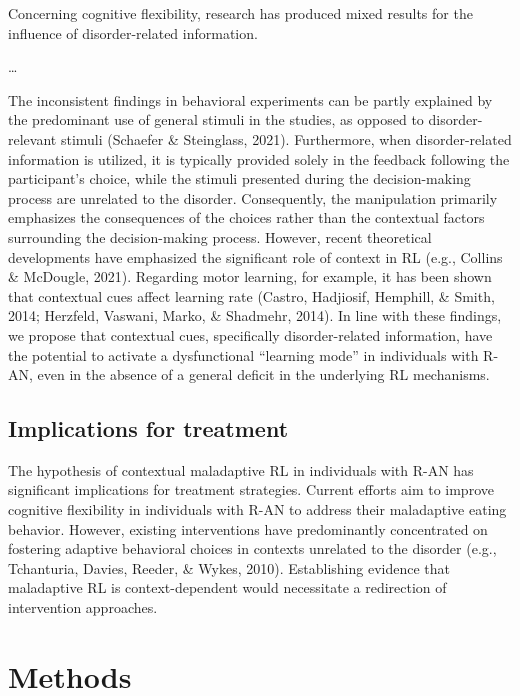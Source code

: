 \documentclass[
  man,floatsintext]{apa6}
\begin{document}
Concerning cognitive flexibility, research has produced mixed results for the influence of disorder-related information.

\ldots{}

The inconsistent findings in behavioral experiments can be partly explained by the predominant use of general stimuli in the studies, as opposed to disorder-relevant stimuli (Schaefer \& Steinglass, 2021). Furthermore, when disorder-related information is utilized, it is typically provided solely in the feedback following the participant's choice, while the stimuli presented during the decision-making process are unrelated to the disorder. Consequently, the manipulation primarily emphasizes the consequences of the choices rather than the contextual factors surrounding the decision-making process. However, recent theoretical developments have emphasized the significant role of context in RL (e.g., Collins \& McDougle, 2021). Regarding motor learning, for example, it has been shown that contextual cues affect learning rate (Castro, Hadjiosif, Hemphill, \& Smith, 2014; Herzfeld, Vaswani, Marko, \& Shadmehr, 2014). In line with these findings, we propose that contextual cues, specifically disorder-related information, have the potential to activate a dysfunctional ``learning mode'' in individuals with R-AN, even in the absence of a general deficit in the underlying RL mechanisms.

\hypertarget{implications-for-treatment}{%
\subsection{Implications for treatment}\label{implications-for-treatment}}

The hypothesis of contextual maladaptive RL in individuals with R-AN has significant implications for treatment strategies. Current efforts aim to improve cognitive flexibility in individuals with R-AN to address their maladaptive eating behavior. However, existing interventions have predominantly concentrated on fostering adaptive behavioral choices in contexts unrelated to the disorder (e.g., Tchanturia, Davies, Reeder, \& Wykes, 2010). Establishing evidence that maladaptive RL is context-dependent would necessitate a redirection of intervention approaches.

\hypertarget{methods}{%
\section{Methods}\label{methods}}
\end{document}
